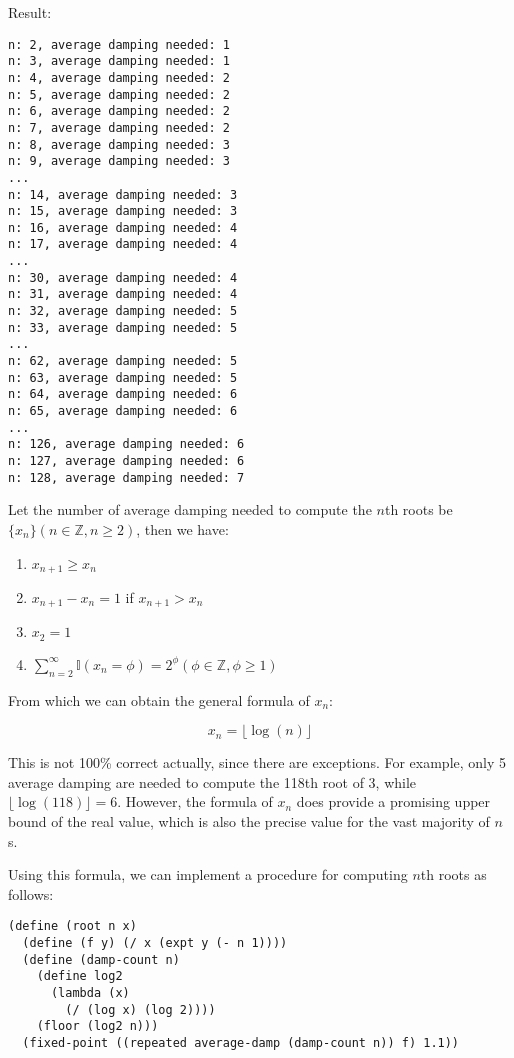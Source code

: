 \documentclass[../main.tex]{subfiles}
\begin{document}
Result:

\begin{lstlisting}
n: 2, average damping needed: 1
n: 3, average damping needed: 1
n: 4, average damping needed: 2
n: 5, average damping needed: 2
n: 6, average damping needed: 2
n: 7, average damping needed: 2
n: 8, average damping needed: 3
n: 9, average damping needed: 3
...
n: 14, average damping needed: 3
n: 15, average damping needed: 3
n: 16, average damping needed: 4
n: 17, average damping needed: 4
...
n: 30, average damping needed: 4
n: 31, average damping needed: 4
n: 32, average damping needed: 5
n: 33, average damping needed: 5
...
n: 62, average damping needed: 5
n: 63, average damping needed: 5
n: 64, average damping needed: 6
n: 65, average damping needed: 6
...
n: 126, average damping needed: 6
n: 127, average damping needed: 6
n: 128, average damping needed: 7
\end{lstlisting}

Let the number of average damping needed to
 compute the $n$th roots be
 $\{x_n\}(n\in\mathbb{Z},n\geq2)$, then we have:

\begin{enumerate}
\item $x_{n+1}\geq x_n$
\item $x_{n+1}-x_n=1$ if $x_{n+1}>x_n$
\item $x_2 = 1$
\item $\sum_{n=2}^\infty\mathbb{I}(x_n=\phi)=2^\phi(\phi\in\mathbb{Z},\phi\geq1)$
\end{enumerate}

From which we can obtain the general formula of $x_n$:

$$
x_n = \lfloor\log(n)\rfloor
$$

This is not 100\% correct actually, since there are
 exceptions. For example, only 5 average damping are
 needed to compute the 118th root of 3, while
 $\lfloor\log(118)\rfloor=6$. However, the formula
 of $x_n$ does provide a promising upper bound of
 the real value, which is also the precise value for
 the vast majority of $n$s.

Using this formula, we can implement a procedure for computing
 $n$th roots as follows:

\begin{lstlisting}
(define (root n x)
  (define (f y) (/ x (expt y (- n 1))))
  (define (damp-count n)
    (define log2
      (lambda (x)
        (/ (log x) (log 2))))
    (floor (log2 n)))
  (fixed-point ((repeated average-damp (damp-count n)) f) 1.1))
\end{lstlisting}
\end{document}
